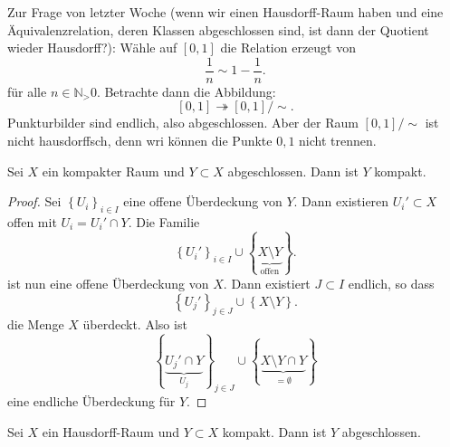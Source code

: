 \begin{dexample}
    Zur Frage von letzter Woche (wenn wir einen Hausdorff-Raum haben und eine Äquivalenzrelation, deren Klassen abgeschlossen sind, ist dann der Quotient wieder  Hausdorff?): Wähle auf $[0,1]$ die Relation erzeugt von
     \[
    \frac{1}{n} \sim  1 - \frac{1}{n}
    .\] 
    für alle $n\in \mathbb{N}_>0$. Betrachte dann die Abbildung: 
    \[
        [0,1] \twoheadrightarrow [0,1] / \sim 
    .\] 
    Punkturbilder sind endlich, also abgeschlossen. Aber der Raum $[0,1] / \sim $ ist nicht hausdorffsch, denn wri können die Punkte $0,1$ nicht trennen.
\end{dexample}
\begin{theorem}\label{thm:abgeschlossene-menge-in-kompaktem-raum-ist-kompakt}
    Sei $X$ ein kompakter Raum und  $Y\subset X$ abgeschlossen. Dann ist $Y$ kompakt.
\end{theorem}
\begin{proof}
    Sei $\left \{U_i\right\} _{i \in I}$ eine offene Überdeckung von $Y$. Dann existieren $U_i' \subset X$ offen mit $U_i = U_i' \cap Y$. Die Familie
     \[
    \left \{U_i'\right\} _{i \in I}\cup \left \{\underbrace{X \setminus Y}_{\text{offen}}\right\} 
    .\] 
    ist nun eine offene Überdeckung von $X$. Dann existiert $J\subset I$ endlich, so dass
    \[
    \left \{U_j'\right\} _{j\in J} \cup \left \{X \setminus Y\right\} 
    .\] 
    die Menge $X$ überdeckt. Also ist  
    \[
        \left \{\underbrace{U_j' \cap Y}_{U_j}\right\} _{j\in J} \cup \left \{\underbrace{X \setminus Y \cap Y}_{=\emptyset}\right\}  
    \]
    eine endliche Überdeckung für $Y$.
\end{proof}
\begin{theorem}\label{thm:kompakte-menge-in-hausdorff-raum-ist-abgeschlossen}
    Sei $X$ ein Hausdorff-Raum und  $Y\subset X$ kompakt. Dann ist $Y$ abgeschlossen.
\end{theorem}


